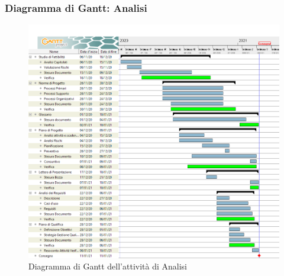 \subsubsection{Diagramma di Gantt: Analisi}
\begin{figure}[ht]
    \centering
    \includegraphics[width=\textwidth]{Immagini/GanttAnalisi}
    \caption{Diagramma di Gantt dell'attività di Analisi}
\end{figure}
